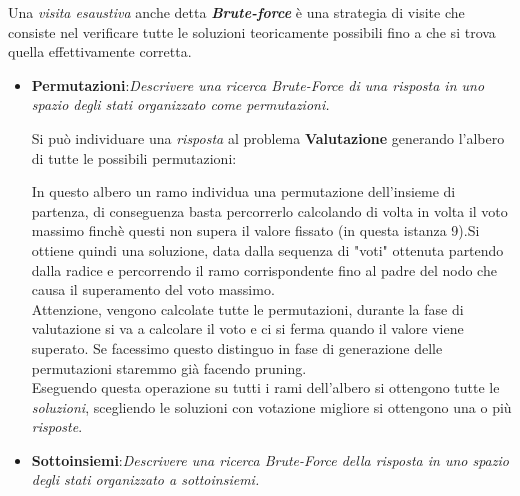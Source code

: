 \documentclass[a4paper]{article}
\newcommand{\imp}[1]{\textbf{\textit{#1}}}
\begin{document}
Una \emph{visita esaustiva} anche detta \imp{Brute-force} è una strategia di visite che consiste nel verificare tutte le soluzioni teoricamente possibili fino a che si trova quella effettivamente corretta.
\begin{itemize}
	\item \textbf{Permutazioni}:\emph{Descrivere una ricerca Brute-Force di una risposta in uno spazio degli stati organizzato come permutazioni.}

		Si può individuare una \emph{risposta} al problema \textbf{Valutazione} generando l'albero di tutte le possibili permutazioni:
		\begin{center}	
		\end{center}
		In questo albero un ramo individua una permutazione dell'insieme di partenza, di conseguenza basta percorrerlo calcolando di volta in volta il voto massimo finchè questi non supera il valore fissato (in questa istanza 9).Si ottiene quindi una soluzione, data dalla sequenza di "voti" ottenuta partendo dalla radice e percorrendo il ramo corrispondente fino al padre del nodo che causa il superamento del voto massimo.\\
		Attenzione, vengono calcolate tutte le permutazioni, durante la fase di valutazione si va a calcolare il voto e ci si ferma quando il valore viene superato.
		Se facessimo questo distinguo in fase di generazione delle permutazioni staremmo già facendo pruning.\\
		Eseguendo questa operazione su tutti i rami dell'albero si ottengono tutte le \emph{soluzioni}, scegliendo le soluzioni con votazione migliore si ottengono una o più \emph{risposte}.
	\item \textbf{Sottoinsiemi}:\emph{Descrivere una ricerca Brute-Force della risposta in uno spazio degli stati organizzato a sottoinsiemi.}


\end{itemize}
\end{document}
